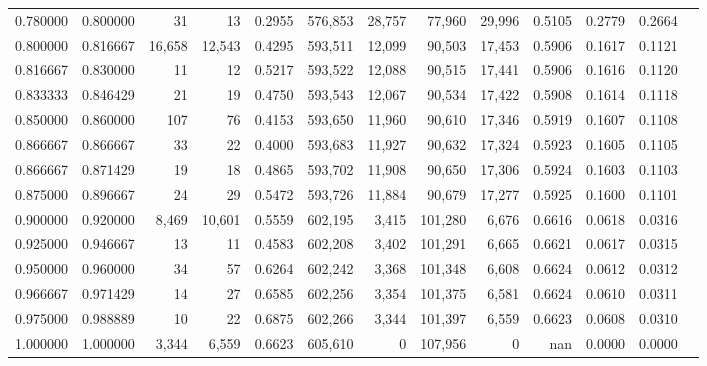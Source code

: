 \begin{tabular}{rrrrrrrrrrrrr}
0.780000 & 0.800000 &     31 &     13 &                                     0.2955 & 576,853 &  28,757 &  77,960 &  29,996 & 0.5105 & 0.2779 & 0.2664 \\
0.800000 & 0.816667 & 16,658 & 12,543 &                                     0.4295 & 593,511 &  12,099 &  90,503 &  17,453 & 0.5906 & 0.1617 & 0.1121 \\
0.816667 & 0.830000 &     11 &     12 &                                     0.5217 & 593,522 &  12,088 &  90,515 &  17,441 & 0.5906 & 0.1616 & 0.1120 \\
0.833333 & 0.846429 &     21 &     19 &                                     0.4750 & 593,543 &  12,067 &  90,534 &  17,422 & 0.5908 & 0.1614 & 0.1118 \\
0.850000 & 0.860000 &    107 &     76 &                                     0.4153 & 593,650 &  11,960 &  90,610 &  17,346 & 0.5919 & 0.1607 & 0.1108 \\
0.866667 & 0.866667 &     33 &     22 &                                     0.4000 & 593,683 &  11,927 &  90,632 &  17,324 & 0.5923 & 0.1605 & 0.1105 \\
0.866667 & 0.871429 &     19 &     18 &                                     0.4865 & 593,702 &  11,908 &  90,650 &  17,306 & 0.5924 & 0.1603 & 0.1103 \\
0.875000 & 0.896667 &     24 &     29 &                                     0.5472 & 593,726 &  11,884 &  90,679 &  17,277 & 0.5925 & 0.1600 & 0.1101 \\
0.900000 & 0.920000 &  8,469 & 10,601 &                                     0.5559 & 602,195 &   3,415 & 101,280 &   6,676 & 0.6616 & 0.0618 & 0.0316 \\
0.925000 & 0.946667 &     13 &     11 &                                     0.4583 & 602,208 &   3,402 & 101,291 &   6,665 & 0.6621 & 0.0617 & 0.0315 \\
0.950000 & 0.960000 &     34 &     57 &                                     0.6264 & 602,242 &   3,368 & 101,348 &   6,608 & 0.6624 & 0.0612 & 0.0312 \\
0.966667 & 0.971429 &     14 &     27 &                                     0.6585 & 602,256 &   3,354 & 101,375 &   6,581 & 0.6624 & 0.0610 & 0.0311 \\
0.975000 & 0.988889 &     10 &     22 &                                     0.6875 & 602,266 &   3,344 & 101,397 &   6,559 & 0.6623 & 0.0608 & 0.0310 \\
1.000000 & 1.000000 &  3,344 &  6,559 &                                     0.6623 & 605,610 &       0 & 107,956 &       0 &    nan & 0.0000 & 0.0000 \\
\bottomrule
\end{tabular}
